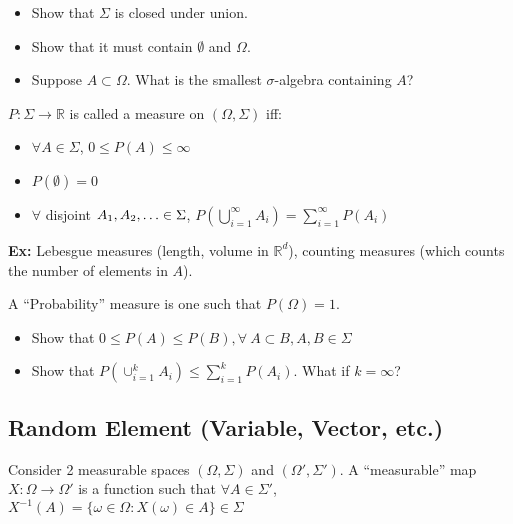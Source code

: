 \documentclass[twoside]{article}
\begin{document}
\begin{exercise}
  \leavevmode
  \begin{itemize}
      \item Show that $\Sigma$ is closed under union.
      \item Show that it must contain $\emptyset$ and $\Omega$.
      \item Suppose $A \subset \Omega$. What is the smallest $\sigma$-algebra containing $A$?
  \end{itemize}
\end{exercise}

\begin{definition}
  $P: \Sigma \rightarrow \mathbb{R}$ is called a measure on $(\Omega, \Sigma)$ iff:

  \begin{itemize}
    \item $\forall A \in \Sigma$, $0 \leq P(A) \leq \infty$
    \item $P(\emptyset)=0$
    \item $\forall$ disjoint $A_1, A_2,\mathellipsis \in \Sigma$, $P(\bigcup\limits_{i=1}^\infty A_i) = \sum\limits_{i=1}^\infty P(A_i)$
  \end{itemize}

  \textbf{Ex: } Lebesgue measures (length, volume in $\mathbb{R}^d$), counting measures (which counts the number of elements in $A$).
\end{definition}

\begin{definition}
  A ``Probability'' measure is one such that $P(\Omega)=1$.
\end{definition}

\begin{exercise}
  \leavevmode
  \begin{itemize}
      \item Show that $0 \leq P(A) \leq P(B), \forall \ A \subset B, A,B \in \Sigma$
      \item Show that $P(\cup_{i=1}^k A_i) \leq \sum_{i=1}^k P(A_i)$. What if $k = \infty$?
  \end{itemize}
\end{exercise}

\subsection{Random Element (Variable, Vector, etc.)}

\begin{definition}
  Consider 2 measurable spaces $(\Omega, \Sigma)$ and $(\Omega', \Sigma')$. A ``measurable'' map $X:\Omega \rightarrow \Omega'$ is a function such that $\forall A \in \Sigma'$, $X^{-1}(A) = \{ \omega \in \Omega: X(\omega) \in A \} \in \Sigma$
\end{definition}
\end{document}
